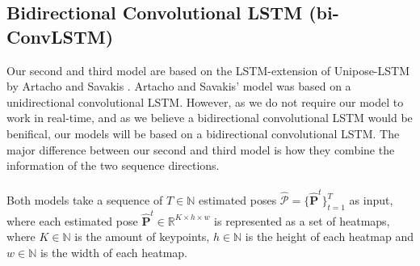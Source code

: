 \documentclass[./main.tex]{subfiles}
\begin{document}
\subsection{Bidirectional Convolutional LSTM (bi-ConvLSTM)}
\label{sec:bi-ConvLSTMs}
\noindent Our second and third model are based on the LSTM-extension of Unipose-LSTM by Artacho and Savakis \cite{https://doi.org/10.48550/arxiv.2001.08095}. Artacho and Savakis' model was based on a unidirectional convolutional LSTM. However, as we do not require our model to work in real-time, and as we believe a bidirectional convolutional LSTM would be benifical, our models will be based on a bidirectional convolutional LSTM. The major difference between our second and third model is how they combine the information of the two sequence directions.
\\
\\
Both models take a sequence of $T \in \mathbb{N}$ estimated poses $\hat{\mathcal{P}} = \{\hat{\bm{P}}^t\}_{t = 1} ^T$ as input, where each estimated pose $\hat{\bm{P}}^t \in \mathbb{R}^{K \times h \times w}$ is represented as a set of heatmaps, where $K \in \mathbb{N}$ is the amount of keypoints, $h \in \mathbb{N}$ is the height of each heatmap and $w \in \mathbb{N}$ is the width of each heatmap. 
\end{document}
